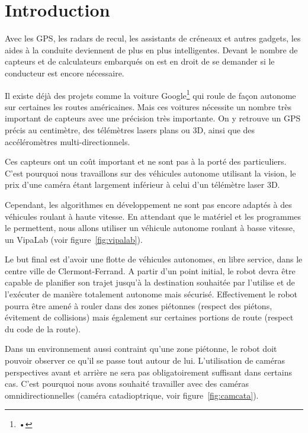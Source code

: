\section{Introduction}

Avec les GPS, les radars de recul, les assistants de créneaux et autres gadgets, les aides à la conduite deviennent de plus en plus intelligentes.
Devant le nombre de capteurs et de calculateurs embarqués on est en droit de se demander si le conducteur est encore nécessaire.

Il existe déjà des projets comme la voiture Google\footnote{•} qui roule de façon autonome sur certaines les routes américaines. Mais ces voitures nécessite un nombre très important de capteurs avec une précision très importante.
On y retrouve un GPS précis au centimètre, des télémètres lasers plans ou 3D, ainsi que des accéléromètres multi-directionnels.

Ces capteurs ont un coût important et ne sont pas à la porté des particuliers.
C'est pourquoi nous travaillons sur des véhicules autonome utilisant la vision, le prix d'une caméra étant largement inférieur à celui d'un télémètre laser 3D.

Cependant, les algorithmes en développement ne sont pas encore adaptés à des véhicules roulant à haute vitesse.
En attendant que le matériel et les programmes le permettent, nous allons utiliser un véhicule autonome roulant à basse vitesse, un VipaLab (voir figure~\ref{fig:vipalab}).


Le but final est d'avoir une flotte de véhicules autonomes, en libre service, dans le centre ville de Clermont-Ferrand.
A partir d'un point initial, le robot devra \^etre capable de planifier son trajet jusqu'à la destination souhaitée par l'utilise et de l'exécuter de manière totalement autonome mais sécurisé.
Effectivement le robot pourra \^etre amené à rouler dans des zones piétonnes (respect des piétons, évitement de collisions) mais également sur certaines portions de route (respect du code de la route).

Dans un environnement aussi contraint qu'une zone piétonne, le robot doit pouvoir observer ce qu'il se passe tout autour de lui.
L'utilisation de caméras perspectives avant et arrière ne sera pas obligatoirement suffisant dans certains cas.
C'est pourquoi nous avons souhaité travailler avec des caméras omnidirectionnelles (caméra catadioptrique, voir figure~\ref{fig:camcata}).

